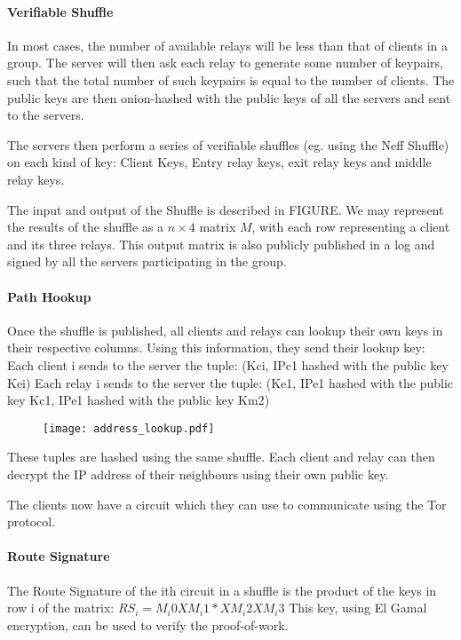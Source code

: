 \paragraph{Verifiable Shuffle} 
In most cases, the number of available relays will be less than that of clients 
in a group. The server will then ask each relay to generate some number of 
keypairs, such that the total number of such keypairs is equal to the number of 
clients. The public keys are then onion-hashed with the public keys of all the 
servers and sent to the servers.

The servers then perform a series of verifiable shuffles (eg. using the Neff
Shuffle) on each kind of key: Client Keys, Entry relay keys, exit relay keys and 
middle relay keys.

The input and output of the Shuffle is described in FIGURE. We may represent the
results of the shuffle as a $n \times 4$ matrix $M$, with each row representing 
a client and its three relays. This output matrix is also publicly published in 
a log and signed by all the servers participating in the group.

\paragraph{Path Hookup}
Once the shuffle is published, all clients and relays can lookup their own keys 
in their respective columns. Using this information, they send their lookup key:
Each client i sends to the server the tuple:
(Kci, {IPc1 hashed with the public key Kei})
Each relay i sends to the server the tuple:
(Ke1, {IPe1 hashed with the public key Kc1}, {IPe1 hashed with the public key Km2})

\begin{figure}
	\centered
		\texttt{[image: address\_lookup.pdf]}
\end{figure}

These tuples are hashed using the same shuffle. Each client and relay can then 
decrypt the IP address of their neighbours using their own public key.

The clients now have a circuit which they can use to communicate using the Tor 
protocol.

\paragraph{Route Signature}
The Route Signature of the ith circuit in a shuffle is the product of the keys
in row i of the matrix:
$RS_i = M_i0 X M_i1 * X M_i2 X M_i3$
This key, using El Gamal encryption, can be used to verify the  proof-of-work.

